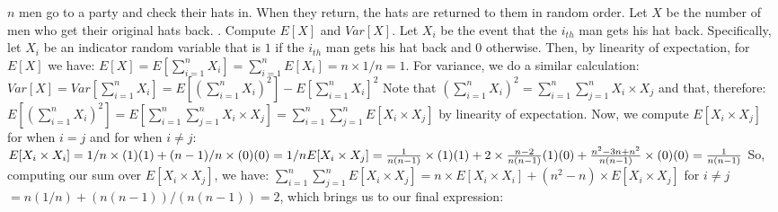 \documentclass[12pt]{article}
\begin{document}
$n$ men go to a party and check their hats in. When they return, the hats are returned to them in random order. Let $X$ be the number
of men who get their original hats back. 
\newline
{}. Compute $E[X]$ and $Var[X]$.
\newline\newline
Let $X_i$ be the event that the $i_{th}$ man gets his hat back. Specifically, let $X_i$ be an indicator random variable that is $1$
if the $i_{th}$ man gets his hat back and $0$ otherwise. Then, by linearity of expectation, for $E[X]$ we have:
\newline
$E[X] = E[\sum\limits_{i=1}^{n} X_i] = \sum\limits_{i=1}^{n} E[X_i] = n \times 1/n = 1$.
\newline
\newline
For variance, we do a similar calculation:
\newline
$Var[X] = Var[\sum\limits_{i=1}^{n} X_i] = E[(\sum\limits_{i=1}^{n} X_i)^2] - E[\sum\limits_{i=1}^{n} X_i]^2$
\newline
Note that $(\sum\limits_{i=1}^{n} X_i)^2 = \sum\limits_{i=1}^{n} \sum\limits_{j=1}^{n} X_i \times X_j$ and that, therefore:
\newline
$E[(\sum\limits_{i=1}^{n} X_i)^2] = E[\sum\limits_{i=1}^{n} \sum\limits_{j=1}^{n} X_i \times X_j] = \sum\limits_{i=1}^{n} \sum\limits_{j=1}^{n} E[X_i \times X_j]$
\newline
by linearity of expectation.
\newline
\newline
Now, we compute $E[X_i \times X_j]$ for when $i = j$ and for when $i \neq j$:
\newline
$E[X_i \times X_i] = 1/n \times (1)(1) + (n-1)/n \times (0)(0) = 1/n
\newline
E[X_i \times X_j] = \frac{1}{n(n-1)} \times (1)(1) + 2 \times \frac{n-2}{n(n-1)} (1)(0) + \frac{n^2 - 3n + n^2}{n(n-1)} \times (0)(0) = \frac{1}{n(n-1)}$
\newline
\newline
So, computing our sum over $E[X_i \times X_j]$, we have: 
\newline
$\sum\limits_{i=1}^{n} \sum\limits_{j=1}^{n} E[X_i \times X_j] = n \times E[X_i \times X_i] + (n^2 - n) \times E[X_i \times X_j]$ for $i \neq j$ 
\newline
$= n (1/n) + (n(n-1))/(n(n-1)) = 2$,
\newline
\newline
which brings us to our final expression:
\end{document}

